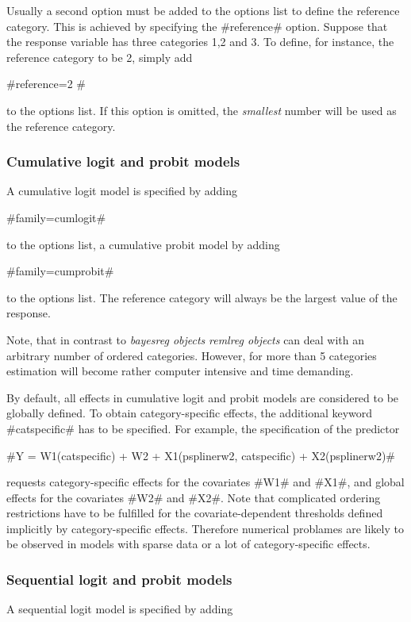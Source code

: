 Usually a second option must be added to the options list to
define the reference category. This is achieved by specifying the
#reference# option. Suppose that the response variable has three
categories 1,2 and 3. To define, for instance, the reference
category to be 2, simply add

#reference=2 #

to the options list. If this option is omitted, the {\em smallest}
number will be used as the reference category.

\subsubsection*{Cumulative logit and probit models}

A cumulative logit model is specified by adding

#family=cumlogit#

to the options list, a cumulative probit model by adding

#family=cumprobit#

to the options list. The reference category will always be the
largest value of the response.

Note, that in contrast to {\em bayesreg objects} {\em remlreg
objects} can deal with an arbitrary number of ordered categories.
However, for more than 5 categories estimation will become rather
computer intensive and time demanding.

By default, all effects in cumulative logit and probit models are
considered to be globally defined. To obtain category-specific
effects, the additional keyword #catspecific# has to be specified.
For example, the specification of the predictor

 #Y = W1(catspecific) + W2 + X1(psplinerw2, catspecific) + X2(psplinerw2)#

requests category-specific effects for the covariates #W1# and #X1#,
and global effects for the covariates #W2# and #X2#. Note that
complicated ordering restrictions have to be fulfilled for the
covariate-dependent thresholds defined implicitly by
category-specific effects. Therefore numerical problames are likely
to be observed in models with sparse data or a lot of
category-specific effects.

\subsubsection*{Sequential logit and probit models}

A sequential logit model is specified by adding


